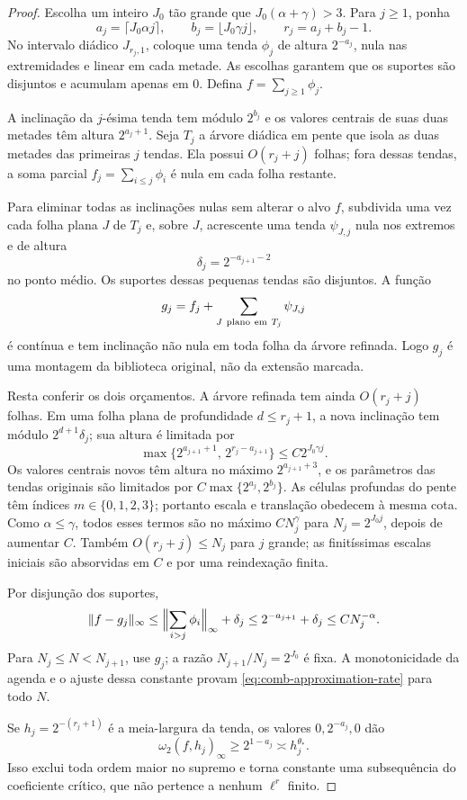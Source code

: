 \begin{proof}
Escolha um inteiro $J_0$ tão grande que
$J_0(\alpha+\gamma)>3$. Para $j\ge1$, ponha
\[
 a_j=\lceil J_0\alpha j\rceil,
 \qquad b_j=\lfloor J_0\gamma j\rfloor,
 \qquad r_j=a_j+b_j-1.
\]
No intervalo diádico $J_{r_j,1}$, coloque uma tenda $\phi_j$ de altura
$2^{-a_j}$, nula nas extremidades e linear em cada metade. As escolhas
garantem que os suportes são disjuntos e acumulam apenas em $0$. Defina
$f=\sum_{j\ge1}\phi_j$.

A inclinação da $j$-ésima tenda tem módulo $2^{b_j}$ e os valores centrais de
suas duas metades têm altura $2^{a_j+1}$. Seja $T_j$ a árvore diádica em pente
que isola as duas metades das primeiras $j$ tendas. Ela possui
$O(r_j+j)$ folhas; fora dessas tendas, a soma parcial
$f_j=\sum_{i\le j}\phi_i$ é nula em cada folha restante.

Para eliminar todas as inclinações nulas sem alterar o alvo $f$, subdivida uma
vez cada folha plana $J$ de $T_j$ e, sobre $J$, acrescente uma tenda
$\psi_{J,j}$ nula nos extremos e de altura
\[
 \delta_j=2^{-a_{j+1}-2}
\]
no ponto médio. Os suportes dessas pequenas tendas são disjuntos. A função
\[
 g_j=f_j+\sum_{J\ {\rm plano\ em}\ T_j}\psi_{J,j}
\]
é contínua e tem inclinação não nula em toda folha da árvore refinada. Logo
$g_j$ é uma montagem da biblioteca original, não da extensão marcada.

Resta conferir os dois orçamentos. A árvore refinada tem ainda
$O(r_j+j)$ folhas. Em uma folha plana de profundidade $d\le r_j+1$, a nova
inclinação tem módulo $2^{d+1}\delta_j$; sua altura é limitada por
\[
 \max\{2^{a_{j+1}+1},\,2^{r_j-a_{j+1}}\}
 \le C2^{J_0\gamma j}.
\]
Os valores centrais novos têm altura no máximo $2^{a_{j+1}+3}$, e os
parâmetros das tendas originais são limitados por
$C\max\{2^{a_j},2^{b_j}\}$. As células profundas do pente têm índices
$m\in\{0,1,2,3\}$; portanto escala e translação obedecem à mesma cota.
Como $\alpha\le\gamma$, todos esses termos são no máximo
$CN_j^\gamma$ para $N_j=2^{J_0j}$, depois de aumentar $C$. Também
$O(r_j+j)\le N_j$ para $j$ grande; as finitíssimas escalas iniciais são
absorvidas em $C$ e por uma reindexação finita.

Por disjunção dos suportes,
\[
 \|f-g_j\|_\infty
 \le \Bigl\|\sum_{i>j}\phi_i\Bigr\|_\infty+\delta_j
 \le 2^{-a_{j+1}}+\delta_j
 \le C N_j^{-\alpha}.
\]
Para $N_j\le N<N_{j+1}$, use $g_j$; a razão
$N_{j+1}/N_j=2^{J_0}$ é fixa. A monotonicidade da agenda e o ajuste dessa
constante provam \eqref{eq:comb-approximation-rate} para todo $N$.

Se $h_j=2^{-(r_j+1)}$ é a meia-largura da tenda, os valores
$0,2^{-a_j},0$ dão
\[
 \omega_2(f,h_j)_\infty\ge2^{1-a_j}\asymp h_j^{\theta_*}.
\]
Isso exclui toda ordem maior no supremo e torna constante uma subsequência do
coeficiente crítico, que não pertence a nenhum $\ell^r$ finito.
\end{proof}

